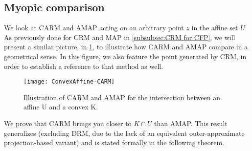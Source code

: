 \documentclass[smallextended,numbook,nospthms]{svjour3}
\theoremstyle{plain}
\theoremstyle{definition}
\begin{document}
\subsection{Myopic comparison}\label{subsec:myopic comp}

We look at CARM and AMAP acting on an arbitrary point $z$ in the affine set $U$. As previously done for CRM and MAP in \cref{subsubsec:CRM for CFP}, we will present a similar picture, in \cref{fig:CARM AMAP comp}, to illustrate how CARM and AMAP compare in a geometrical sense. In this figure, we also feature the point generated by CRM, in order to establish a reference to that method as well.

\begin{figure}[h!]
	\centering
	\texttt{[image: ConvexAffine-CARM]}
	\caption{Illustration of CARM and AMAP for the intersection between an affine U and a convex K.}
	\label{fig:CARM AMAP comp}
\end{figure}

We prove that CARM brings you closer to $K \cap U$ than AMAP. This result generalizes \cite[Theorem 2]{Behling:2020} (excluding DRM, due to the lack of an equivalent outer-approximate projection-based variant) and is stated formally in the following theorem.
\end{document}
